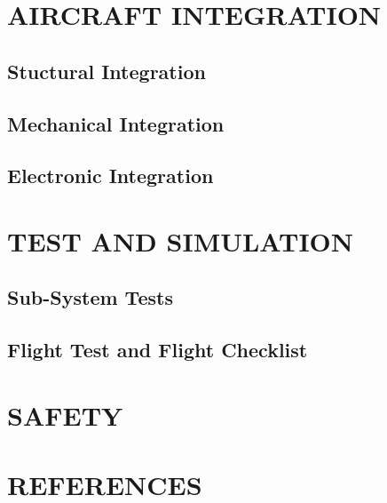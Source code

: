 \documentclass[12pt]{article}
\begin{document}
\section{AIRCRAFT INTEGRATION}
\subsection{Stuctural Integration}
\subsection{Mechanical Integration}
\subsection{Electronic Integration}

\section{TEST AND SIMULATION}
\subsection{Sub-System Tests}
\subsection{Flight Test and Flight Checklist}

\section{SAFETY}

\section{REFERENCES}

\singlespacing
 

\end{document}

